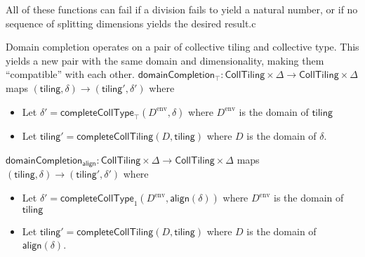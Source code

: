 \filbreak
All of these functions can fail if a division fails to yield a natural number, or if no sequence of splitting dimensions yields the desired result.c

\filbreak
{}

Domain completion operates on a pair of collective tiling and collective type.
This yields a new pair with the same domain and dimensionality, making them ``compatible'' with each other.
\filbreak
$\mathsf{domainCompletion_\top} : \mathsf{CollTiling} \times \Delta \to \mathsf{CollTiling} \times \Delta$
maps $(\mathsf{tiling}, \delta) \to (\mathsf{tiling}', \delta')$ where
\begin{itemize}
  \item Let $\delta' = \mathsf{completeCollType}_\top(D^\text{env}, \delta)$
    where $D^\text{env}$ is the domain of $\mathsf{tiling}$
  \filbreak
  \item Let $\mathsf{tiling}' = \mathsf{completeCollTiling}(D, \mathsf{tiling})$
    where $D$ is the domain of $\delta$.
\end{itemize}
\filbreak
$\mathsf{domainCompletion_{align}} : \mathsf{CollTiling} \times \Delta \to \mathsf{CollTiling} \times \Delta$
maps $(\mathsf{tiling}, \delta) \to (\mathsf{tiling}', \delta')$ where
\begin{itemize}
  \item Let $\delta' = \mathsf{completeCollType}_1(D^\text{env}, \mathsf{align}(\delta))$
    where $D^\text{env}$ is the domain of $\mathsf{tiling}$
  \filbreak
  \item Let $\mathsf{tiling}' = \mathsf{completeCollTiling}(D, \mathsf{tiling})$
    where $D$ is the domain of $\mathsf{align}(\delta)$.
\end{itemize}

\filbreak
{}



